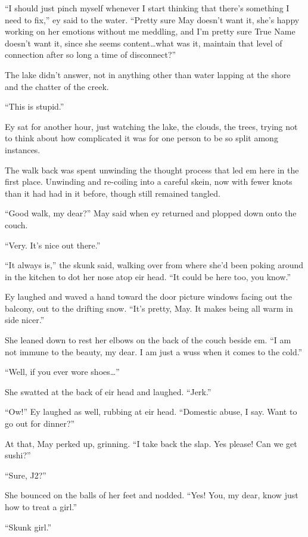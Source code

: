 ``I should just pinch myself whenever I start thinking that there's something I need to fix,'' ey said to the water. ``Pretty sure May doesn't want it, she's happy working on her emotions without me meddling, and I'm pretty sure True Name doesn't want it, since she seems content\ldots what was it, maintain that level of connection after so long a time of disconnect?''

The lake didn't answer, not in anything other than water lapping at the shore and the chatter of the creek.

``This is stupid.''

Ey sat for another hour, just watching the lake, the clouds, the trees, trying not to think about how complicated it was for one person to be so split among instances.

The walk back was spent unwinding the thought process that led em here in the first place. Unwinding and re-coiling into a careful skein, now with fewer knots than it had had in it before, though still remained tangled.

``Good walk, my dear?'' May said when ey returned and plopped down onto the couch.

``Very. It's nice out there.''

``It always is,'' the skunk said, walking over from where she'd been poking around in the kitchen to dot her nose atop eir head. ``It could be here too, you know.''

Ey laughed and waved a hand toward the door picture windows facing out the balcony, out to the drifting snow. ``It's pretty, May. It makes being all warm in side nicer.''

She leaned down to rest her elbows on the back of the couch beside em. ``I am not immune to the beauty, my dear. I am just a wuss when it comes to the cold.''

``Well, if you ever wore shoes\ldots{}''

She swatted at the back of eir head and laughed. ``Jerk.''

``Ow!'' Ey laughed as well, rubbing at eir head. ``Domestic abuse, I say. Want to go out for dinner?''

At that, May perked up, grinning. ``I take back the slap. Yes please! Can we get sushi?''

``Sure, J2?''

She bounced on the balls of her feet and nodded. ``Yes! You, my dear, know just how to treat a girl.''

``Skunk girl.''


